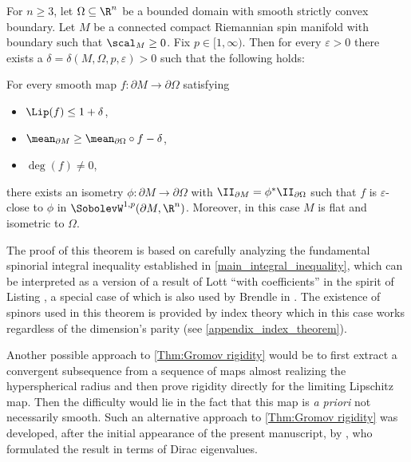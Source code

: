 \documentclass[a4paper,11pt]{amsart}
\numberwithin{equation}{section}
\begin{document}
\begin{theorem}\label{Thm:Llarull intro}
    For $n\geq3$, let \(\Omega \subseteq \R^n\) be a bounded domain with smooth strictly convex boundary.
    Let \(M\) be a connected compact Riemannian spin manifold with boundary such that \(\scal_M \geq 0\). 
    Fix \(p \in [1,\infty)\).
    Then for every \(\varepsilon > 0\) there exists a \(\delta=\delta(M,\Omega,p,\varepsilon) > 0\) such that the following holds:
    
    For every smooth map \(f \colon \partial M \to \partial \Omega\) satisfying
    \begin{itemize}
        \item \(\Lip(f) \leq 1+\delta\),
        \item \(\mean_{\partial M} \geq \mean_{\partial \Omega} \circ f - \delta\),
        \item \(\deg(f) \neq 0\),
    \end{itemize}
    there exists an isometry \(\phi \colon \partial M \to \partial \Omega\) with \(\II_{\partial M} =  \phi^\ast \II_{\partial \Omega}\) such that \(f\) is \(\varepsilon\)-close to \(\phi\) in \(\SobolevW^{1,p}(\partial M, \R^n)\).
    Moreover, in this case \(M\) is flat and isometric to \(\Omega\).
\end{theorem}

The proof of this theorem is based on carefully analyzing the fundamental spinorial integral inequality established in \cref{main_integral_inequality}, which can be interpreted as a version of a result of Lott \cite[Theorem 1.1]{Lott} \enquote{with coefficients} in the spirit of Listing \cite{listing2010scalar}, a special case of which is also used by Brendle in \cite{brendle2024scalar}.
The existence of spinors used in this theorem is provided by index theory which in this case works regardless of the dimension's parity (see \cref{appendix_index_theorem}).

Another possible approach to \cref{Thm:Gromov rigidity} would be to first extract a convergent subsequence from a sequence of maps almost realizing the hyperspherical radius and then prove rigidity directly for the limiting Lipschitz map.
Then the difficulty would lie in the fact that this map is \emph{a priori} not necessarily smooth.
Such an alternative approach to \cref{Thm:Gromov rigidity} was developed, after the initial appearance of the present manuscript, by \textcite{baer2024diraceigenvalueshypersphericalradius}, who formulated the result in terms of Dirac eigenvalues.
\end{document}
